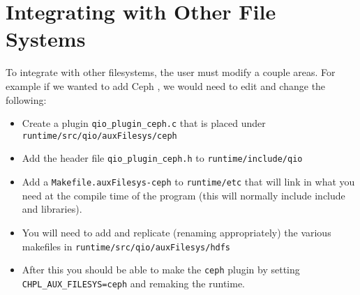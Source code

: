 \section{Integrating with Other File Systems}\label{s:OFS}

To integrate with other filesystems, the user must modify a couple areas. For
example if we wanted to add Ceph \cite{ceph}, we would need to edit and change the following:
\begin{itemize}
\item Create a plugin {\tt qio\_plugin\_ceph.c} that is placed under {\tt runtime/src/qio/auxFilesys/ceph}
\item Add the header file {\tt qio\_plugin\_ceph.h} to {\tt runtime/include/qio}
\item Add a {\tt Makefile.auxFilesys-ceph} to {\tt runtime/etc} that will link in what you need at the compile time of the program (this will normally include include and libraries).
\item You will need to add and replicate (renaming appropriately)  the various
makefiles in {\tt runtime/src/qio/auxFilesys/hdfs}
\item After this you should be able to make the {\tt ceph} plugin by setting {\tt
CHPL\_AUX\_FILESYS=ceph} and remaking the runtime.
\end{itemize}


